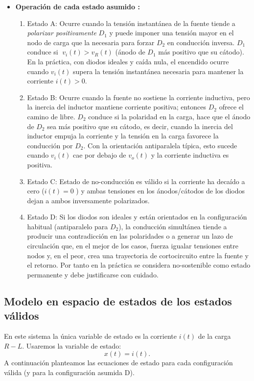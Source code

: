 \documentclass[conference]{IEEEtran}
\begin{document}
\begin{itemize}
  \item \textbf{Operación de cada estado asumido :}
    \begin{enumerate}
      \item Estado A: Ocurre cuando la tensión instantánea de la fuente tiende a \emph{polarizar positivamente} \(D_1\) y puede imponer una tensión mayor en el nodo de carga que la necesaria para forzar \(D_2\) en conducción inversa. \(D_1\) conduce si \(\;v_i(t) > v_R(t)\) (ánodo de \(D_1\) más positivo que su cátodo). En la práctica, con diodos ideales y caída nula, el encendido ocurre cuando \(v_i(t)\) supera la tensión instantánea necesaria para mantener la corriente \(i(t)>0\).
      \item Estado B: Ocurre cuando la fuente no sostiene la corriente inductiva, pero la inercia del inductor mantiene corriente positiva; entonces \(D_2\) ofrece el camino de libre. \(D_2\) conduce si la polaridad en la carga, hace que el ánodo de \(D_2\) sea más positivo que su cátodo, es decir, cuando la inercia del inductor empuja la corriente y la tensión en la carga favorece la conducción por \(D_2\). Con la orientación antiparalela típica, esto sucede cuando \(v_i(t)\) cae por debajo de \(v_o(t)\) y la corriente inductiva es positiva.
      \item Estado C: Estado de no-conducción es válido si la corriente ha decaído a cero (\(i(t)=0\)  ) y ambas tensiones en los ánodos/cátodos de los diodos dejan a ambos inversamente polarizados.
      \item Estado D: Si los diodos son ideales y están orientados en la configuración habitual (antiparalelo para \(D_2\)), la conducción simultánea tiende a producir una contradicción en las polaridades o a generar un lazo de circulación que, en el mejor de los casos, fuerza igualar tensiones entre nodos y, en el peor, crea una trayectoria de cortocircuito entre la fuente y el retorno. Por tanto en la práctica se considera no-sostenible como estado permanente y debe justificarse con cuidado.
\end{enumerate}
\end{itemize}

 


\subsection{Modelo en espacio de estados de los estados válidos }
En este sistema la única variable de estado es la corriente \(i(t)\) de la carga \(R\!-\!L\). Usaremos la variable de estado:
\[
x(t)=i(t).
\]
A continuación planteamos las ecuaciones de estado para cada configuración válida (y para la configuración asumida D).
\end{document}
